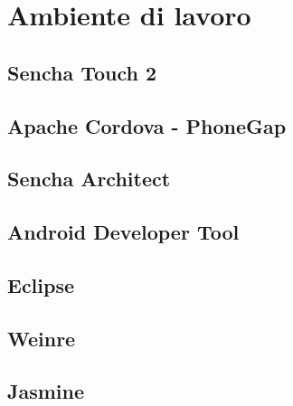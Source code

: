 \chapter{Ambiente di lavoro}\label{ch:ambiente di lavoro}

\section{Sencha Touch 2}

\section{Apache Cordova - PhoneGap}

\section{Sencha Architect}

\section{Android Developer Tool}

\section{Eclipse}

\section{Weinre}

\section{Jasmine}